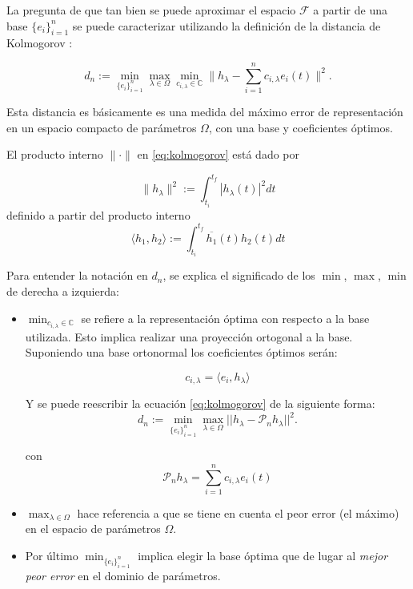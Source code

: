 La pregunta de que tan bien se puede aproximar el espacio $\mathcal{F}$ a partir de una base $\{e_i\}_{i=1}^n$ se puede caracterizar utilizando la definición de la distancia de Kolmogorov \cite{Pinkus1985nWidthsIA}:

\begin{equation} \label{eq:kolmogorov}
d_n := \min_{\{e_i\}_{i=1}^n} \max_{\lambda \in \Omega} \min_{ c_{i,\lambda} \in \mathbb{C}} \| h_{\lambda} - \sum_{i=1}^{n} c_{i,\lambda} e_i(t)\|^2.
\end{equation}



Esta distancia es básicamente es una medida del máximo error de representación en un espacio compacto de parámetros $\Omega$, con una base y coeficientes óptimos.

El producto interno $\|\cdot\|$ en \eqref{eq:kolmogorov} está dado por

\[
\|h_{\lambda}\|^2 :=\int_{t_i}^{t_f}|h_{\lambda}(t)|^2dt
\]
definido a partir del producto interno
\[
\langle h_1, h_2 \rangle  :=\int_{t_i}^{t_f} \overline{h_{1}}(t) h_2 (t)dt
\]

Para entender la notación en $d_n$, se explica el significado de los $\min$, $\max$, $\min$ de derecha a izquierda:

\begin{itemize}
\item $\min_{ c_{i,\lambda} \in \mathbb{C}}$ se refiere a la representación óptima con respecto a la base utilizada. Esto implica realizar una proyección ortogonal a la base. Suponiendo una base ortonormal los coeficientes óptimos serán:

\begin{equation} \label{eq:coefs}
c_{i, \lambda} = \langle e_i, h_{\lambda} \rangle 
\end{equation}

Y se puede reescribir la ecuación \eqref{eq:kolmogorov} de la siguiente forma:
\[
d_n := \min_{\{e_i\}_{i=1}^n} \max_{\lambda \in \Omega} || h_{\lambda} - \mathcal{P}_nh_{\lambda} ||^2.
\]

con 
\begin{equation}
\mathcal{P}_nh_{\lambda} = \sum_{i=1}^{n} c_{i,\lambda} e_i(t)
\end{equation}

\item $\max_{\lambda \in \Omega}$ hace referencia a que se tiene en cuenta el peor error (el máximo) en el espacio de parámetros $\Omega$. 
\item Por último $\min_{\{e_i\}_{i=1}^n}$ implica elegir la base óptima que de lugar al \textit{mejor peor error} en el dominio de parámetros.
\end{itemize}

